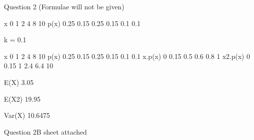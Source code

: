 
Question 2 
(Formulae will not be given)


x
0
1
2
4
8
10
p(x)
0.25
0.15
0.25
0.15
0.1
0.1



























k = 
0.1
























x
0
1
2
4
8
10
p(x)
0.25
0.15
0.25
0.15
0.1
0.1
x.p(x)
0
0.15
0.5
0.6
0.8
1
x2.p(x)
0
0.15
1
2.4
6.4
10




E(X)
3.05










E(X2)
19.95
























Var(X) 
10.6475







Question 2B sheet attached

